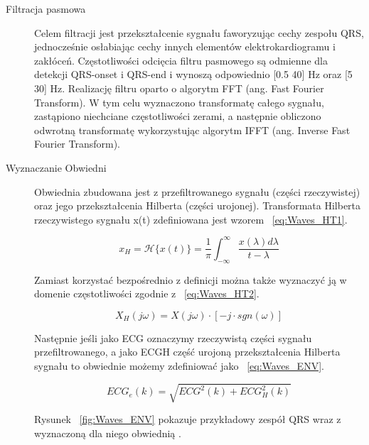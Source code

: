 \begin{description}
\item[Filtracja pasmowa]
Celem filtracji jest przekształcenie sygnału faworyzując cechy zespołu QRS, jednocześnie osłabiając cechy innych elementów elektrokardiogramu i zakłóceń. Częstotliwości odcięcia filtru pasmowego są odmienne dla detekcji QRS-onset i QRS-end i wynoszą odpowiednio [0.5 40] Hz oraz [5 30] Hz. Realizację filtru oparto o algorytm FFT (ang. Fast Fourier Transform). W tym celu  
wyznaczono transformatę całego sygnału, zastąpiono niechciane częstotliwości zerami, a następnie obliczono odwrotną transformatę wykorzystując algorytm IFFT (ang. Inverse Fast Fourier Transform).

\item[Wyznaczanie Obwiedni]
Obwiednia zbudowana jest z przefiltrowanego sygnału (części rzeczywistej) oraz jego przekształcenia Hilberta (części urojonej). Transformata Hilberta rzeczywistego sygnału x(t) zdefiniowana jest wzorem ~\ref{eq:Waves_HT1}.

\begin{equation} \label{eq:Waves_HT1}
x_H = \mathcal{H}\{x(t)\}=\frac{1}{\pi}\int_{-\infty}^\infty \frac{x(\lambda)d\lambda}{t-\lambda}
\end{equation}

Zamiast korzystać bezpośrednio z definicji można także wyznaczyć ją w domenie częstotliwości zgodnie z ~\ref{eq:Waves_HT2}.

\begin{equation} \label{eq:Waves_HT2}
X_H (j \omega) = X(j \omega) \cdot [-j \cdot sgn(\omega)]
\end{equation}

Następnie jeśli jako ECG oznaczymy rzeczywistą części sygnału przefiltrowanego, a jako ECGH część urojoną przekształcenia Hilberta sygnału to obwiednie możemy zdefiniować jako ~\ref{eq:Waves_ENV}.

\begin{equation} \label{eq:Waves_ENV}
ECG_{e} (k) = \sqrt{ECG^2 (k)+ ECG_{H}^2 (k) }
\end{equation}

Rysunek ~\ref{fig:Waves_ENV} pokazuje przykładowy zespół QRS wraz z wyznaczoną dla niego obwiednią . 


\end{description}
